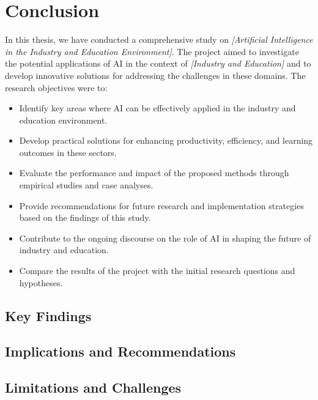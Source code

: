\chapter{Conclusion}
\label{chap:Conclusion}



In this thesis, we have conducted a comprehensive study on \emph{[Artificial Intelligence in the Industry and Education
Environment]}.
The project aimed to investigate the potential applications of AI in the context of \emph{[Industry and Education]} and to develop innovative solutions for addressing the challenges in these domains.
The research objectives were to:
\begin{itemize}
    \item Identify key areas where AI can be effectively applied in the industry and education environment.
    \item Develop practical solutions for enhancing productivity, efficiency, and learning outcomes in these sectors.
    \item Evaluate the performance and impact of the proposed methods through empirical studies and case analyses.
    \item Provide recommendations for future research and implementation strategies based on the findings of this study.
    \item Contribute to the ongoing discourse on the role of AI in shaping the future of industry and education.
    \item Compare the results of the project with the initial research questions and hypotheses.
\end{itemize}

\section{Key Findings}

\section{Implications and Recommendations}

\section{Limitations and Challenges}


